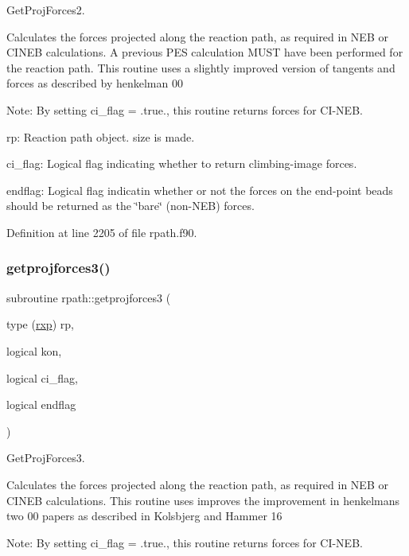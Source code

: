Get\+Proj\+Forces2. 

Calculates the forces projected along the reaction path, as required in N\+EB or C\+I\+N\+EB calculations. A previous P\+ES calculation M\+U\+ST have been performed for the reaction path. This routine uses a slightly improved version of tangents and forces as described by henkelman 00

Note\+: By setting ci\+\_\+flag = .true., this routine returns forces for C\+I-\/\+N\+EB.


\begin{DoxyItemize}
\item rp\+: Reaction path object. size is made.
\item ci\+\_\+flag\+: Logical flag indicating whether to return climbing-\/image forces.
\item endflag\+: Logical flag indicatin whether or not the forces on the end-\/point beads should be returned as the \char`\"{}bare\char`\"{} (non-\/\+N\+EB) forces. 
\end{DoxyItemize}

Definition at line 2205 of file rpath.\+f90.

\mbox{\label{namespacerpath_a79ee81833120305547c237a755918472}} 
\subsubsection{\texorpdfstring{getprojforces3()}{getprojforces3()}}
{\footnotesize\ttfamily subroutine rpath\+::getprojforces3 (\begin{DoxyParamCaption}\item[{type (\mbox{\hyperlink{structrpath_1_1rxp}{rxp}})}]{rp,  }\item[{logical}]{kon,  }\item[{logical}]{ci\+\_\+flag,  }\item[{logical}]{endflag }\end{DoxyParamCaption})}



Get\+Proj\+Forces3. 

Calculates the forces projected along the reaction path, as required in N\+EB or C\+I\+N\+EB calculations. This routine uses improves the improvement in henkelmans two 00 papers as described in Kolsbjerg and Hammer 16

Note\+: By setting ci\+\_\+flag = .true., this routine returns forces for C\+I-\/\+N\+EB.


